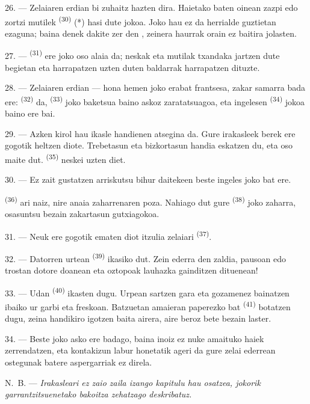 26. --- Zelaiaren erdian bi zuhaitz hazten dira. Haietako baten oinean zazpi edo
zortzi mutilek  \textsuperscript{(30)} (*) hasi
dute jokoa. Joko hau ez da herrialde guztietan ezaguna; baina denek dakite zer
den , zeinera haurrak orain ez baitira jolasten.

\VUsaut{5.0mm}
\VUsaut{3.4mm}

27. ---  \textsuperscript{(31)} ere joko oso alaia da; neskak
eta mutilak txandaka  jartzen dute begietan eta harrapatzen uzten
duten baldarrak harrapatzen dituzte.

28. --- Zelaiaren erdian --- hona hemen joko erabat frantsesa, zakar samarra
bada ere:  \textsuperscript{(32)} da, 
\textsuperscript{(33)} joko baketsua baino askoz zaratatsuagoa, eta ingelesen
 \textsuperscript{(34)} jokoa baino ere bai.

29. --- Azken kirol hau ikasle handienen atsegina da. Gure irakasleek berek ere
gogotik heltzen diote. Trebetasun eta bizkortasun handia eskatzen du, eta oso
maite dut.  \textsuperscript{(35)} neskei uzten diet.

30. --- Ez zait gustatzen arriskutsu bihur daitekeen beste ingeles joko bat ere.

 \textsuperscript{(36)} ari naiz, nire anaia zaharrenaren
poza. Nahiago dut gure  \textsuperscript{(38)} joko zaharra,
osasuntsu bezain zakartasun gutxiagokoa.

\VUsaut{4.6mm}
\VUsaut{3.0mm}

31. --- Neuk ere gogotik ematen diot itzulia zelaiari 
\textsuperscript{(37)}.

32. --- Datorren urtean  \textsuperscript{(39)} ikasiko
dut. Zein ederra den zaldia, pausoan edo trostan dotore doanean eta oztopoak
lauhazka gainditzen dituenean!

33. --- Udan  \textsuperscript{(40)} ikasten dugu. Urpean
sartzen gara eta gozamenez bainatzen ibaiko ur garbi eta freskoan. Batzuetan
amaieran paperezko  bat \textsuperscript{(41)} botatzen dugu, zeina
handikiro igotzen baita airera, aire beroz bete bezain laster.

34. --- Beste joko asko ere badago, baina inoiz ez nuke amaituko haiek
zerrendatzen, eta kontakizun labur honetatik ageri da gure zelai ederrean
ostegunak batere aspergarriak ez direla.

N.~B. --- \textit{Irakasleari ez zaio zaila izango kapitulu hau osatzea, jokorik
garrantzitsuenetako bakoitza zehatzago deskribatuz.}
\VUsaut{6.0mm}
\VUfilet{22mm}
